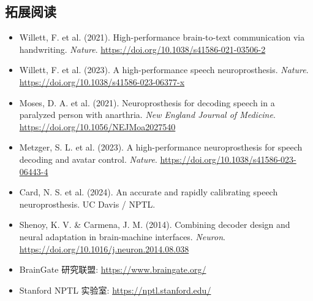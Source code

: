 \documentclass[a4paper]{article}
\begin{document}
\subsection{拓展阅读}

\begin{itemize}
    \item Willett, F. et al. (2021). High-performance brain-to-text communication via handwriting. \textit{Nature}. \url{https://doi.org/10.1038/s41586-021-03506-2}
    \item Willett, F. et al. (2023). A high-performance speech neuroprosthesis. \textit{Nature}. \url{https://doi.org/10.1038/s41586-023-06377-x}
    \item Moses, D. A. et al. (2021). Neuroprosthesis for decoding speech in a paralyzed person with anarthria. \textit{New England Journal of Medicine}. \url{https://doi.org/10.1056/NEJMoa2027540}
    \item Metzger, S. L. et al. (2023). A high-performance neuroprosthesis for speech decoding and avatar control. \textit{Nature}. \url{https://doi.org/10.1038/s41586-023-06443-4}
    \item Card, N. S. et al. (2024). An accurate and rapidly calibrating speech neuroprosthesis. UC Davis / NPTL.
    \item Shenoy, K. V. \& Carmena, J. M. (2014). Combining decoder design and neural adaptation in brain-machine interfaces. \textit{Neuron}. \url{https://doi.org/10.1016/j.neuron.2014.08.038}
    \item BrainGate 研究联盟: \url{https://www.braingate.org/}
    \item Stanford NPTL 实验室: \url{https://nptl.stanford.edu/}
\end{itemize}
\end{document}
